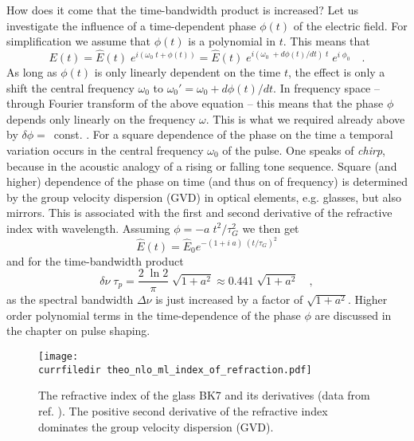 How does it come that the time-bandwidth product is increased? 
Let us investigate the  influence of a time-dependent phase $\phi(t)$
of the electric field. For simplification we 
assume that $\phi(t)$ is a polynomial in $t$. This means that
\begin{equation}
  E(t) = \hat{E}(t) \; e^{i ( \omega_0 \; t + \phi(t))}
  = \hat{E}(t) \; e^{i ( \omega_0 \; + d\phi(t)/dt) \; t} \; e^{i
  \; \phi_0}  \quad . \label{gl_theo_nlo_ml_field_with_phase}
\end{equation}
As long as $\phi(t)$ is only linearly dependent on the time $t$, the effect is
 only a shift the central frequency $\omega_0$ to
$\omega_0' = \omega_0 + d\phi(t)/dt$.  In frequency space -- through
Fourier transform of the above equation --  this means that the
phase $\phi$ depends only linearly on the frequency $\omega$. This
is what we required already above by  
$\delta \phi =$~const. . For a square
dependence of the phase on the time a temporal variation occurs
in the central frequency $\omega_0$ of the pulse. One  speaks
of \emph{chirp}, because in the acoustic analogy of a
rising or falling tone sequence. Square
(and higher) dependence of the phase on time (and thus on
of frequency) is determined by the group velocity dispersion
(GVD) in optical elements,
e.g. glasses, but also mirrors. This is associated with the
first and second derivative of the refractive index with 
wavelength. Assuming $\phi = - a \;
t^2 / \tau_G^2$ we then get
\begin{equation}
  \hat{E}(t) = \hat{E}_0 e^{- (1 + i \; a) \; ( t / \tau_G ) ^2}
\end{equation}
and for the time-bandwidth product
\begin{equation}
  \delta \nu \; \tau_p = \frac{2 \; \ln 2}{\pi} \; \sqrt{1 + a^2} \approx
  0.441 \; \sqrt{1 + a^2} \quad ,
\end{equation}
as the spectral bandwidth $\Delta \nu$ is just increased by a factor of
$\sqrt{1 + a^2}$. Higher order polynomial terms in the time-dependence of the phase $\phi$ are discussed in the chapter on  pulse shaping.



\begin{figure}
\center
\texttt{[image: \\currfiledir theo\_nlo\_ml\_index\_of\_refraction.pdf]}
\caption{The refractive index of the glass BK7 and its derivatives
(data from ref. \cite{DielsRudolph1996}). The
positive second derivative of the refractive index dominates the
group velocity dispersion (GVD). }
\label{fig_pulses_ior_gvd}
\end{figure}



